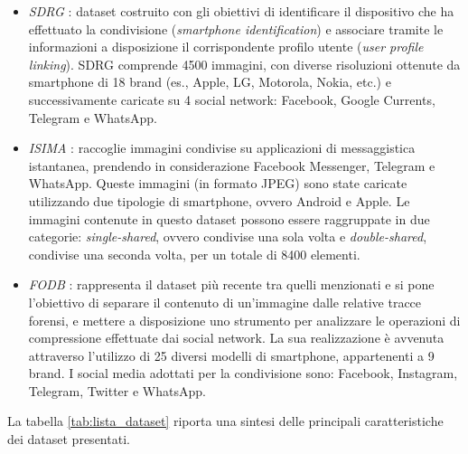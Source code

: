 \begin{itemize}
    \item \textit{SDRG} \cite{rouhi2021no}: dataset costruito con gli obiettivi di identificare il dispositivo che ha effettuato la condivisione (\textit{smartphone identification}) e associare tramite le informazioni a disposizione il corrispondente profilo utente (\textit{user profile linking}). SDRG comprende 4500 immagini, con diverse risoluzioni ottenute da smartphone di 18 brand (es., Apple, LG, Motorola, Nokia, etc.) e successivamente caricate su 4 social network: Facebook, Google Currents, Telegram e WhatsApp.
    
    \item \textit{ISIMA} \cite{Phan2018}: raccoglie immagini condivise su applicazioni di messaggistica istantanea, prendendo in considerazione Facebook Messenger, Telegram e WhatsApp. Queste immagini (in formato JPEG) sono state caricate utilizzando due tipologie di smartphone, ovvero Android e Apple. Le immagini contenute in questo dataset possono essere raggruppate in due categorie: \textit{single-shared}, ovvero condivise una sola volta e \textit{double-shared}, condivise una seconda volta, per un totale di 8400 elementi.
    
    \item \textit{FODB} \cite{hadwiger2021forchheim}: rappresenta il dataset più recente tra quelli menzionati e si pone l'obiettivo di separare il contenuto di un'immagine dalle relative tracce forensi, e mettere a disposizione uno strumento per analizzare le operazioni di compressione effettuate dai social network. La sua realizzazione è avvenuta attraverso l'utilizzo di 25 diversi modelli di smartphone, appartenenti a 9 brand. I social media adottati per la condivisione sono: Facebook, Instagram, Telegram, Twitter e WhatsApp.
    
\end{itemize}
La tabella \ref{tab:lista_dataset} riporta una sintesi delle principali caratteristiche dei dataset presentati. 

